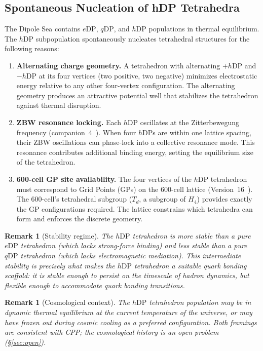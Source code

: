\documentclass[12pt]{article}
\newtheorem{remark}[theorem]{Remark}
\newcommand{\eDP}{e\mathrm{DP}}
\newcommand{\qDP}{q\mathrm{DP}}
\newcommand{\hDP}{h\mathrm{DP}}
\begin{document}
\subsection{Spontaneous Nucleation of hDP Tetrahedra}

The Dipole Sea contains $\eDP$, $\qDP$, and $\hDP$ populations in
thermal equilibrium.  The $\hDP$ subpopulation spontaneously nucleates
tetrahedral structures for the following reasons:

\begin{enumerate}
\item \textbf{Alternating charge geometry.}  A tetrahedron with
  alternating $+\hDP$ and $-\hDP$ at its four vertices (two positive,
  two negative) minimizes electrostatic energy relative to any other
  four-vertex configuration.  The alternating geometry produces an
  attractive potential well that stabilizes the tetrahedron against
  thermal disruption.

\item \textbf{ZBW resonance locking.}  Each $\hDP$ oscillates at
  the Zitterbewegung frequency (companion~4~\cite{c4}).  When four
  $\hDP$s are within one lattice spacing, their ZBW oscillations
  can phase-lock into a collective resonance mode.  This resonance
  contributes additional binding energy, setting the equilibrium
  size of the tetrahedron.

\item \textbf{600-cell GP site availability.}  The four vertices of
  the $\hDP$ tetrahedron must correspond to Grid Points (GPs) on
  the 600-cell lattice (Version~16~\cite{v16}).  The 600-cell's
  tetrahedral subgroup ($T_d$, a subgroup of $H_4$) provides exactly
  the GP configurations required.  The lattice constrains which
  tetrahedra can form and enforces the discrete geometry.
\end{enumerate}

\begin{remark}[Stability regime]
The $\hDP$ tetrahedron is more stable than a pure $\eDP$ tetrahedron
(which lacks strong-force binding) and less stable than a pure $\qDP$
tetrahedron (which lacks electromagnetic mediation).  This intermediate
stability is precisely what makes the $\hDP$ tetrahedron a suitable
quark bonding scaffold: it is stable enough to persist on the timescale
of hadron dynamics, but flexible enough to accommodate quark bonding
transitions.
\end{remark}

\begin{remark}[Cosmological context]
The $\hDP$ tetrahedron population may be in dynamic thermal
equilibrium at the current temperature of the universe, or may have
frozen out during cosmic cooling as a preferred configuration.  Both
framings are consistent with CPP; the cosmological history is an open
problem (§\ref{sec:open}).
\end{remark}
\end{document}
